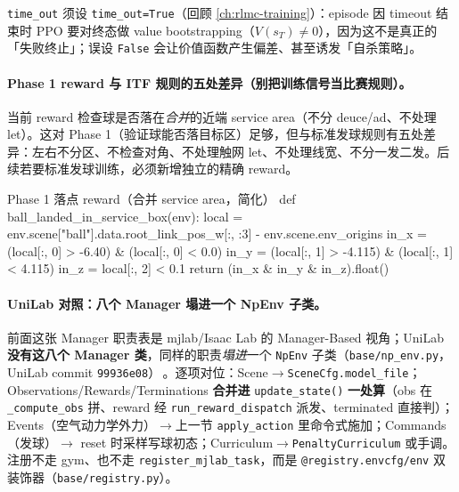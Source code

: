 \verb|time_out| 须设 \verb|time_out=True|（回顾 \cref{ch:rlmc-training}）：episode 因 timeout 结束时 PPO 要对终态做 value bootstrapping（$V(s_T)\neq0$），因为这不是真正的「失败终止」；误设 \verb|False| 会让价值函数产生偏差、甚至诱发「自杀策略」。

\paragraph{Phase 1 reward 与 ITF 规则的五处差异（别把训练信号当比赛规则）。}当前 reward 检查球是否落在\emph{合并}的近端 service area（不分 deuce/ad、不处理 let）。这对 Phase 1（验证球能否落目标区）足够，但与标准发球规则有五处差异：左右不分区、不检查对角、不处理触网 let、不处理线宽、不分一发二发。后续若要标准发球训练，必须新增独立的精确 reward。

\begin{codebox}[Python]{Phase 1 落点 reward（合并 service area，简化）}
def ball_landed_in_service_box(env):
    local = env.scene["ball"].data.root_link_pos_w[:, :3] - env.scene.env_origins
    in_x = (local[:, 0] > -6.40) & (local[:, 0] < 0.0)
    in_y = (local[:, 1] > -4.115) & (local[:, 1] < 4.115)
    in_z = local[:, 2] < 0.1
    return (in_x & in_y & in_z).float()
\end{codebox}

\paragraph{UniLab 对照：八个 Manager 塌进一个 NpEnv 子类。}前面这张 Manager 职责表是 mjlab/Isaac Lab 的 Manager-Based 视角；UniLab \textbf{没有这八个 Manager 类}，同样的职责\emph{塌进}一个 \verb|NpEnv| 子类（\verb|base/np_env.py|，UniLab commit \texttt{99936e08}）\,\cite{unilab2026}。逐项对位：Scene$\to$\verb|SceneCfg.model_file|；Observations/Rewards/Terminations \textbf{合并进} \verb|update_state()| \textbf{一处算}（obs 在 \verb|_compute_obs| 拼、reward 经 \verb|run_reward_dispatch| 派发、terminated 直接判）；Events（空气动力学外力）$\to$上一节 \verb|apply_action| 里命令式施加；Commands（发球）$\to$ reset 时采样写球初态；Curriculum$\to$\verb|PenaltyCurriculum| 或手调。注册不走 gym、也不走 \verb|register_mjlab_task|，而是 \verb|@registry.envcfg/env| 双装饰器（\verb|base/registry.py|）。

